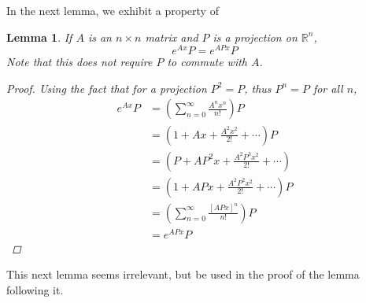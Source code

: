 \documentclass[12pt]{article}
\def\R{{\mathbb R}}
\newtheorem{lemma}{Lemma}
\begin{document}
In the next lemma, we exhibit a property of 

\begin{lemma}\label{expproj}
If $A$ is an $n \times n$ matrix and $P$ is a projection on $\R^n$, 
\[
e^{Ax} P = e^{APx} P 
\]
Note that this does not require $P$ to commute with $A$.
\begin{proof} 
Using the fact that for a projection $P^2 = P$, thus $P^n = P$ for all $n$,
\begin{align*}
e^{Ax} P &= \left( \sum_{n = 0}^\infty \frac{ A^n x^n }{n!} \right) P \\
&= \left(1 + Ax + \frac{A^2 x^2}{2!} + \cdots \right) P \\
&= \left(P + AP^2 x + \frac{A^2 P^3 x^2}{2!} + \cdots \right)\\
&= \left(1 + AP x + \frac{A^2 P^2 x^2}{2!} + \cdots \right) P \\
&= \left( \sum_{n = 0}^\infty \frac{ [ A P x]^n}{n!} \right) P \\
&= e^{AP x} P
\end{align*}
\end{proof}
\end{lemma}

This next lemma seems irrelevant, but be used in the proof of the lemma following it.
\end{document}
